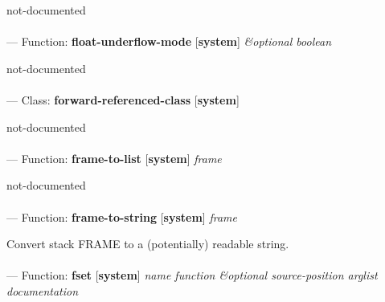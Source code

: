 \begin{adjustwidth}{5em}{5em}
not-documented
\end{adjustwidth}

\paragraph{}
\label{SYSTEM:FLOAT-UNDERFLOW-MODE}
--- Function: \textbf{float-underflow-mode} [\textbf{system}] \textit{\&optional boolean}

\begin{adjustwidth}{5em}{5em}
not-documented
\end{adjustwidth}

\paragraph{}
\label{SYSTEM:FORWARD-REFERENCED-CLASS}
--- Class: \textbf{forward-referenced-class} [\textbf{system}] \textit{}

\begin{adjustwidth}{5em}{5em}
not-documented
\end{adjustwidth}

\paragraph{}
\label{SYSTEM:FRAME-TO-LIST}
--- Function: \textbf{frame-to-list} [\textbf{system}] \textit{frame}

\begin{adjustwidth}{5em}{5em}
not-documented
\end{adjustwidth}

\paragraph{}
\label{SYSTEM:FRAME-TO-STRING}
--- Function: \textbf{frame-to-string} [\textbf{system}] \textit{frame}

\begin{adjustwidth}{5em}{5em}
Convert stack FRAME to a (potentially) readable string.
\end{adjustwidth}

\paragraph{}
\label{SYSTEM:FSET}
--- Function: \textbf{fset} [\textbf{system}] \textit{name function \&optional source-position arglist documentation}


